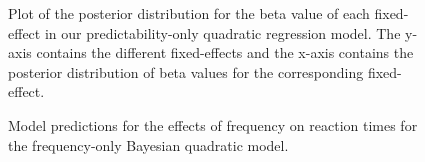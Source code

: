\documentclass[
  12pt,
  letterpaper,
]{scrreprt}
\begin{document}
\begin{figure}[htbp]

\caption{\label{fig-PredicOnlyBetaPlot}Plot of the posterior
distribution for the beta value of each fixed-effect in our
predictability-only quadratic regression model. The y-axis contains the
different fixed-effects and the x-axis contains the posterior
distribution of beta values for the corresponding fixed-effect.}


\end{figure}%

\begin{figure}[htbp]

\caption{\label{fig-FreqOnlyPlot}Model predictions for the effects of
frequency on reaction times for the frequency-only Bayesian quadratic
model.}


\end{figure}%
\end{document}
